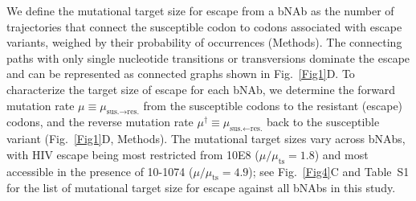 \documentclass[aps,prx,noshowpacs,twocolumn,nofootinbib]{revtex4-2}
\newcommand{\ts}{{\text{ts}}}
\begin{document}
 We define the mutational target size for escape from a bNAb as the number of trajectories that connect the susceptible codon to codons associated with escape variants, weighed by their probability of occurrences (Methods).  The connecting paths with only single nucleotide transitions or transversions dominate the escape and can be represented as connected graphs shown in Fig.~\ref{Fig1}D. To characterize the  target size of escape for each bNAb, we determine the forward mutation rate {$\mu \equiv \mu_{\text{sus.} \to \text{res.}}$ from the susceptible codons to the resistant (escape) codons, and the reverse mutation rate  $\mu^\dagger \equiv \mu_{\text{sus.} \leftarrow \text{res.}}$} back to the susceptible variant (Fig.~\ref{Fig1}D, Methods). The  mutational target sizes vary across  bNAbs,  with HIV escape being most restricted from 10E8 ($\mu/\mu_{\ts} = 1.8$) and most accessible in the presence of 10-1074 ($\mu/\mu_{\ts} = 4.9$); see Fig.~\ref{Fig4}C and Table~S1 for the list of mutational target size for escape against all bNAbs in this study.\\
\end{document}
